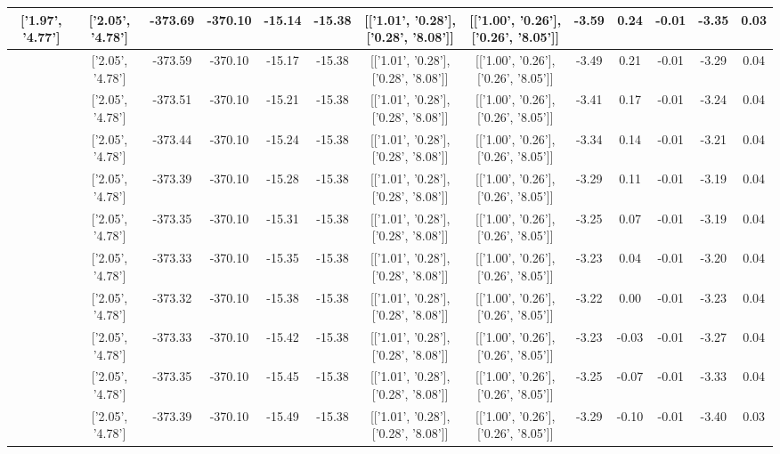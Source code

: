 \begin{table}[htbp]
\begin{adjustbox}{angle=90}
\begin{tabular}{|c|c|c|c|c|c|c|c|c|c|c|c|c|}
 ['1.97', '4.77'] & ['2.05', '4.78'] & -373.69 & -370.10 & -15.14 & -15.38 & [['1.01', '0.28'], ['0.28', '8.08']] & [['1.00', '0.26'], ['0.26', '8.05']] & -3.59 & 0.24 & -0.01 & -3.35 & 0.03\\ \hline
 ['1.98', '4.77'] & ['2.05', '4.78'] & -373.59 & -370.10 & -15.17 & -15.38 & [['1.01', '0.28'], ['0.28', '8.08']] & [['1.00', '0.26'], ['0.26', '8.05']] & -3.49 & 0.21 & -0.01 & -3.29 & 0.04\\ \hline
 ['1.99', '4.77'] & ['2.05', '4.78'] & -373.51 & -370.10 & -15.21 & -15.38 & [['1.01', '0.28'], ['0.28', '8.08']] & [['1.00', '0.26'], ['0.26', '8.05']] & -3.41 & 0.17 & -0.01 & -3.24 & 0.04\\ \hline
 ['2.01', '4.77'] & ['2.05', '4.78'] & -373.44 & -370.10 & -15.24 & -15.38 & [['1.01', '0.28'], ['0.28', '8.08']] & [['1.00', '0.26'], ['0.26', '8.05']] & -3.34 & 0.14 & -0.01 & -3.21 & 0.04\\ \hline
 ['2.02', '4.78'] & ['2.05', '4.78'] & -373.39 & -370.10 & -15.28 & -15.38 & [['1.01', '0.28'], ['0.28', '8.08']] & [['1.00', '0.26'], ['0.26', '8.05']] & -3.29 & 0.11 & -0.01 & -3.19 & 0.04\\ \hline
 ['2.03', '4.78'] & ['2.05', '4.78'] & -373.35 & -370.10 & -15.31 & -15.38 & [['1.01', '0.28'], ['0.28', '8.08']] & [['1.00', '0.26'], ['0.26', '8.05']] & -3.25 & 0.07 & -0.01 & -3.19 & 0.04\\ \hline
 ['2.04', '4.78'] & ['2.05', '4.78'] & -373.33 & -370.10 & -15.35 & -15.38 & [['1.01', '0.28'], ['0.28', '8.08']] & [['1.00', '0.26'], ['0.26', '8.05']] & -3.23 & 0.04 & -0.01 & -3.20 & 0.04\\ \hline
 ['2.05', '4.78'] & ['2.05', '4.78'] & -373.32 & -370.10 & -15.38 & -15.38 & [['1.01', '0.28'], ['0.28', '8.08']] & [['1.00', '0.26'], ['0.26', '8.05']] & -3.22 & 0.00 & -0.01 & -3.23 & 0.04\\ \hline
 ['2.06', '4.79'] & ['2.05', '4.78'] & -373.33 & -370.10 & -15.42 & -15.38 & [['1.01', '0.28'], ['0.28', '8.08']] & [['1.00', '0.26'], ['0.26', '8.05']] & -3.23 & -0.03 & -0.01 & -3.27 & 0.04\\ \hline
 ['2.07', '4.79'] & ['2.05', '4.78'] & -373.35 & -370.10 & -15.45 & -15.38 & [['1.01', '0.28'], ['0.28', '8.08']] & [['1.00', '0.26'], ['0.26', '8.05']] & -3.25 & -0.07 & -0.01 & -3.33 & 0.04\\ \hline
 ['2.09', '4.79'] & ['2.05', '4.78'] & -373.39 & -370.10 & -15.49 & -15.38 & [['1.01', '0.28'], ['0.28', '8.08']] & [['1.00', '0.26'], ['0.26', '8.05']] & -3.29 & -0.10 & -0.01 & -3.40 & 0.03\\ \hline

\end{tabular}
\end{adjustbox}
\end{table}
